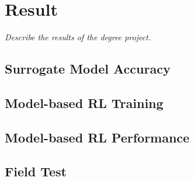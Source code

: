 \chapter{Result}
\label{chap5}
\textit{Describe the results of the degree project.}

\section{Surrogate Model Accuracy}

\section{Model-based RL Training}

\section{Model-based RL Performance}

\section{Field Test}
